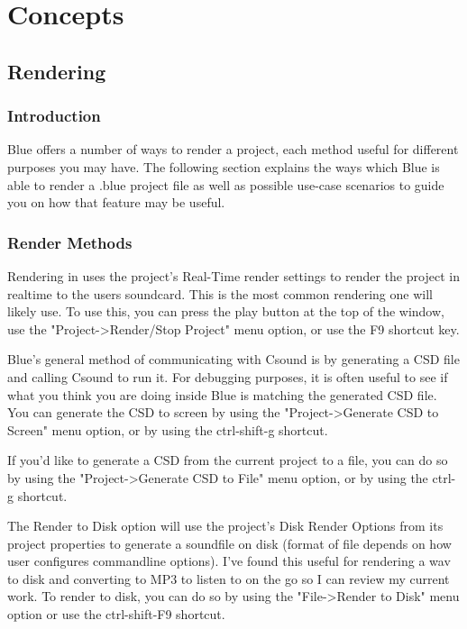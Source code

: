 \chapter{Concepts}\label{concepts}

\section{Rendering}\label{rendering}

\subsection{Introduction}

Blue offers a number of ways to render a project, each method useful for
different purposes you may have. The following section explains the ways
which Blue is able to render a .blue project file as well as possible
use-case scenarios to guide you on how that feature may be useful.

\subsection{Render Methods}

Rendering in uses the project's Real-Time render settings to render the
project in realtime to the users soundcard. This is the most common
rendering one will likely use. To use this, you can press the play
button at the top of the window, use the
"Project-\textgreater{}Render/Stop Project" menu option, or use the F9
shortcut key.

Blue's general method of communicating with Csound is by generating a
CSD file and calling Csound to run it. For debugging purposes, it is
often useful to see if what you think you are doing inside Blue is
matching the generated CSD file. You can generate the CSD to screen by
using the "Project-\textgreater{}Generate CSD to Screen" menu option, or
by using the ctrl-shift-g shortcut.

If you'd like to generate a CSD from the current project to a file, you
can do so by using the "Project-\textgreater{}Generate CSD to File" menu
option, or by using the ctrl-g shortcut.

The Render to Disk option will use the project's Disk Render Options
from its project properties to generate a soundfile on disk (format of
file depends on how user configures commandline options). I've found
this useful for rendering a wav to disk and converting to MP3 to listen
to on the go so I can review my current work. To render to disk, you can
do so by using the "File-\textgreater{}Render to Disk" menu option or
use the ctrl-shift-F9 shortcut.

